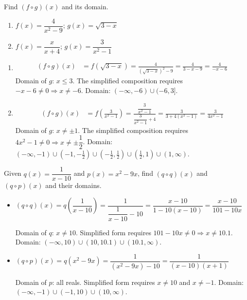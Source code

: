 \documentclass{ximera}
\begin{document}
\begin{problem}
Find $(f\circ g)(x)$ and its domain.
\begin{enumerate}
  \item[(a)] $f(x) = \dfrac{4}{x^2-9}$; \quad $g(x) = \sqrt{3-x}$
  \medskip
  \item[(b)] $f(x) = \dfrac{x}{x+4}$; \quad $g(x) = \dfrac{3}{x^2-1}$
\end{enumerate}

\begin{solution}
\begin{enumerate}
  \item[(a)]
  \begin{align*}
    (f\circ g)(x) &= f\!\left(\sqrt{3-x}\right) = \frac{4}{(\sqrt{3-x})^2-9} = \frac{4}{3-x-9} = \frac{4}{-x-6}
  \end{align*}
  Domain of $g$: $x\leq 3$. The simplified composition requires $-x-6\neq0 \Rightarrow x\neq-6$. Domain: $(-\infty,-6)\cup(-6,3]$.

  \item[(b)]
  \begin{align*}
    (f\circ g)(x) &= f\!\left(\frac{3}{x^2-1}\right) = \frac{\dfrac{3}{x^2-1}}{\dfrac{3}{x^2-1}+4} = \frac{3}{3+4(x^2-1)} = \frac{3}{4x^2-1}
  \end{align*}
  Domain of $g$: $x\neq\pm1$. The simplified composition requires $4x^2-1\neq0 \Rightarrow x\neq\pm\dfrac{1}{2}$. Domain: $(-\infty,-1)\cup\!\left(-1,-\tfrac{1}{2}\right)\cup\!\left(-\tfrac{1}{2},\tfrac{1}{2}\right)\cup\!\left(\tfrac{1}{2},1\right)\cup(1,\infty)$.
\end{enumerate}
\end{solution}
\end{problem}


\begin{problem}
Given $q(x) = \dfrac{1}{x-10}$ and $p(x) = x^2-9x$, find $(q\circ q)(x)$ and $(q\circ p)(x)$ and their domains.

\begin{solution}
\begin{itemize}
  \item $(q\circ q)(x) = q\!\left(\dfrac{1}{x-10}\right) = \dfrac{1}{\dfrac{1}{x-10}-10} = \dfrac{x-10}{1-10(x-10)} = \dfrac{x-10}{101-10x}$

  Domain of $q$: $x\neq10$. Simplified form requires $101-10x\neq0 \Rightarrow x\neq10.1$. Domain: $(-\infty,10)\cup(10,10.1)\cup(10.1,\infty)$.

  \item $(q\circ p)(x) = q(x^2-9x) = \dfrac{1}{(x^2-9x)-10} = \dfrac{1}{(x-10)(x+1)}$

  Domain of $p$: all reals. Simplified form requires $x\neq10$ and $x\neq-1$. Domain: $(-\infty,-1)\cup(-1,10)\cup(10,\infty)$.
\end{itemize}
\end{solution}
\end{problem}
\end{document}
